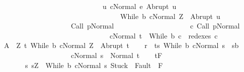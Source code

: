 \begin{isabellebody}
\ \ \ \ \ \ \ \ \ \ \ \ \ \ \ \ \ \ \ \ \ \ \ \ \ \ \ \ \ {\isacharparenleft}{\isasymforall}u{\isachardot}\ {\isasymGamma}{\isasymturnstile}{\isasymlangle}c{\isacharcomma}Normal\ e{\isasymrangle}\ {\isasymRightarrow}Abrupt\ u\ {\isasymlongrightarrow}\ \isanewline
\ \ \ \ \ \ \ \ \ \ \ \ \ \ \ \ \ \ \ \ \ \ \ \ \ \ \ \ \ \ \ \ \ \ {\isasymGamma}{\isasymturnstile}{\isasymlangle}While\ b\ c{\isacharcomma}Normal\ Z{\isasymrangle}\ {\isasymRightarrow}\ Abrupt\ u{\isacharparenright}{\isacharparenright}\ {\isasymand}\isanewline
\ \ \ \ \ \ \ \ \ \ \ \ \ \ \ \ \ \ \ \ {\isasymGamma}{\isasymturnstile}Call\ p{\isasymdown}Normal\ {\isasymsigma}\ {\isasymand}\ \isanewline
\ \ \ \ \ \ \ \ \ \ \ \ \ \ \ \ \ \ {\isacharparenleft}{\isasymexists}c{\isacharprime}{\isachardot}\ {\isasymGamma}{\isasymturnstile}{\isacharparenleft}Call\ p{\isacharcomma}Normal\ {\isasymsigma}{\isacharparenright}\ {\isasymrightarrow}\isactrlsup {\isacharplus}\ \isanewline
\ \ \ \ \ \ \ \ \ \ \ \ \ \ \ \ \ \ \ \ \ \ \ \ \ \ \ \ \ \ \ {\isacharparenleft}c{\isacharprime}{\isacharcomma}Normal\ t{\isacharparenright}\ {\isasymand}\ While\ b\ c\ {\isasymin}\ redexes\ c{\isacharprime}{\isacharparenright}{\isacharbraceright}{\isachardoublequoteclose}\isanewline
\ \ \isamarkupfalse%
\ {\isacharquery}A\ {\isacharequal}\ {\isachardoublequoteopen}{\isasymlambda}Z{\isachardot}\ {\isacharbraceleft}t{\isachardot}\ {\isasymGamma}{\isasymturnstile}{\isasymlangle}While\ b\ c{\isacharcomma}Normal\ Z{\isasymrangle}\ {\isasymRightarrow}\ Abrupt\ t{\isacharbraceright}{\isachardoublequoteclose}\isanewline
\ \ \isamarkupfalse%
\ {\isacharquery}r\ {\isacharequal}\ {\isachardoublequoteopen}{\isacharbraceleft}{\isacharparenleft}t{\isacharcomma}s{\isacharparenright}{\isachardot}\ {\isasymGamma}{\isasymturnstile}{\isacharparenleft}While\ b\ c{\isacharparenright}{\isasymdown}Normal\ s\ {\isasymand}\ s{\isasymin}b\ {\isasymand}\ \ \isanewline
\ \ \ \ \ \ \ \ \ \ \ \ \ \ \ \ \ \ \ \ {\isasymGamma}{\isasymturnstile}{\isasymlangle}c{\isacharcomma}Normal\ s{\isasymrangle}\ {\isasymRightarrow}\ Normal\ t{\isacharbraceright}{\isachardoublequoteclose}\isanewline
\ \ \isamarkupfalse%
\ {\isachardoublequoteopen}{\isasymGamma}{\isacharcomma}{\isasymTheta}{\isasymturnstile}\isactrlsub t\isactrlbsub {\isacharslash}F\isactrlesub \ \isanewline
\ \ \ \ \ \ \ {\isacharbraceleft}s{\isachardot}\ s{\isacharequal}Z\ {\isasymand}\ {\isasymGamma}{\isasymturnstile}{\isasymlangle}While\ b\ c{\isacharcomma}Normal\ s{\isasymrangle}\ {\isasymRightarrow}{\isasymnotin}{\isacharparenleft}{\isacharbraceleft}Stuck{\isacharbraceright}\ {\isasymunion}\ Fault\ {\isacharbackquote}\ {\isacharparenleft}{\isacharminus}F{\isacharparenright}{\isacharparenright}\ {\isasymand}\ \isanewline

\end{isabellebody}
